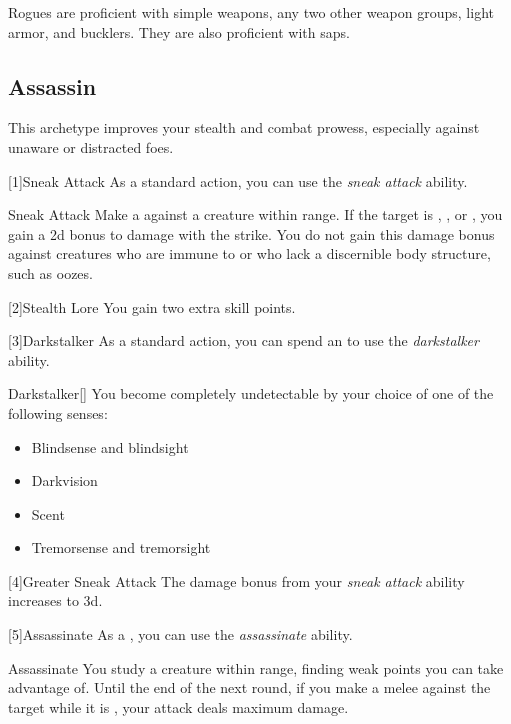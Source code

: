         Rogues are proficient with simple weapons, any two other weapon groups, light armor, and bucklers.
        They are also proficient with saps.

    \subsection{Assassin}
        This archetype improves your stealth and combat prowess, especially against unaware or distracted foes.

        [1]{Sneak Attack} As a standard action, you can use the \textit{sneak attack} ability.
        \begin{ability}{Sneak Attack}
            Make a  against a creature within \rngclose range.
            If the target is \unaware, , or , you gain a \plus2d bonus to damage with the strike.
            You do not gain this damage bonus against creatures who are immune to  or who lack a discernible body structure, such as oozes.
        \end{ability}

        [2]{Stealth Lore} You gain two extra skill points.

        [3]{Darkstalker} As a standard action, you can spend an  to use the \textit{darkstalker} ability.
        \begin{ability}{Darkstalker}[]
            You become completely undetectable by your choice of one of the following senses:
            \begin{itemize}
                \item Blindsense and blindsight
                \item Darkvision
                \item Scent
                \item Tremorsense and tremorsight
            \end{itemize}
        \end{ability}

        [4]{Greater Sneak Attack}
        The damage bonus from your \textit{sneak attack} ability increases to \plus3d.

        [5]{Assassinate} As a , you can use the \textit{assassinate} ability.
        \begin{ability}{Assassinate}
            You study a creature within \rnglong range, finding weak points you can take advantage of.
            Until the end of the next round, if you make a melee  against the target while it is \unaware, your attack deals maximum damage.
        \end{ability}

